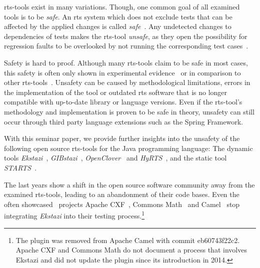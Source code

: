 \ac{rts}-tools exist in many variations. Though, one common goal of all examined tools is to be \emph{safe}.
An \ac{rts} system which does not exclude tests that can be affected by the applied changes is called
\emph{safe}~\cite{safe_definition}. Any undetected changes to dependencies of tests makes the \ac{rts}-tool \emph{unsafe},
as they open the possibility for regression faults to be overlooked by not running the corresponding
test cases~\cite{rts_techniques}.

Safety is hard to proof. Although many \ac{rts}-tools claim to be safe in most cases, this safety is
often only shown in experimental
evidence~\cite{unsafety_eval,gibstazi_paper} or in comparison to other \ac{rts}-tools~\cite{prestarts,starts_paper,gibstazi_paper}. Unsafety can be caused by methodological
limitations, errors in the implementation of the tool or outdated \ac{rts} software that is no
longer compatible with up-to-date library or language versions.\cite{unsafety_eval} Even if the \ac{rts}-tool's
methodology and implementation is proven to be safe in theory, unsafety can still occur through
third party language extensions such as the Spring Framework. 

With this seminar paper, we provide further insights into the unsafety of the following
open source \ac{rts}-tools for the Java programming language: The dynamic tools
\emph{Ekstazi}~\cite{ekstazimain,ekstazi_tool}, \emph{GIBstazi}~\cite{gibstazi_paper,gibstazi_tool},
\emph{OpenClover}~\cite{openclover_tool} and \emph{HyRTS}~\cite{hyrts_paper,hyrts_tool}, and
the static tool \emph{STARTS}~\cite{starts_paper,starts_tool}.

The last years show a shift in the open source software community away from the examined
\ac{rts}-tools, leading to an abandonment of their code bases. 
Even the often showcased~\cite{hyrts_paper,ekstazispec,ekstazimain} 
projects Apache CXF~\cite{cxf}, Commons Math~\cite{commonsmath}
and Camel~\cite{camel} stop integrating \emph{Ekstazi} into their testing process.\footnote{The
plugin was removed from Apache Camel with commit eb60743f22c2. Apache CXF and Commons Math do not
document a process that involves Ekstazi and did not update the plugin since its introduction in 2014.}

